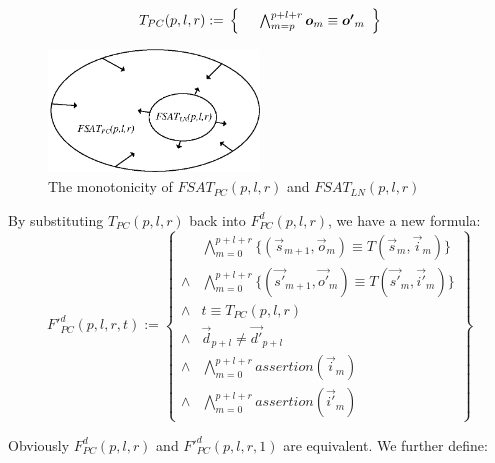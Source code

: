 \documentclass[runningheads,a4paper,orivec]{llncs}
\begin{document}
\begin{equation}\label{tpc}
T_{PC}(p,l,r):=\\
\left\{
\begin{array}{cc}
      &\bigwedge_{m=p}^{p+l+r}\vec{o}_m\equiv \vec{o'}_m \\
\end{array}
\right\}
\end{equation}

\begin{figure}[t]
\begin{center}
\includegraphics[width=0.5\textwidth]{mono}
\end{center}
\caption{The monotonicity of $FSAT_{PC}(p,l,r)$ and $FSAT_{LN}(p,l,r)$}
  \label{fig_mono}
\end{figure}

By substituting $T_{PC}(p,l,r)$ back into $F^d_{PC}(p,l,r)$,
we have a new formula:
\begin{equation}\label{fpcq}
F'^d_{PC}(p,l,r,t):=
\left\{
\begin{array}{cc}
&\bigwedge_{m=0}^{p+l+r}
\{
(\vec{s}_{m+1},\vec{o}_m)\equiv T(\vec{s}_m,\vec{i}_m)
\}
\\
\wedge&\bigwedge_{m=0}^{p+l+r}
\{
(\vec{s'}_{m+1},\vec{o'}_m)\equiv T(\vec{s'}_m,\vec{i'}_m)
\}
\\
\wedge& t\equiv T_{PC}(p,l,r)\\
\wedge& \vec{d}_{p+l}\ne \vec{d'}_{p+l} \\
\wedge&\bigwedge_{m=0}^{p+l+r}assertion(\vec{i}_m) \\
\wedge&\bigwedge_{m=0}^{p+l+r}assertion(\vec{i'}_m) 
\end{array}
\right\}
\end{equation}


Obviously $F^d_{PC}(p,l,r)$ and $F'^d_{PC}(p,l,r,1)$ are equivalent.
We further define:
\end{document}
